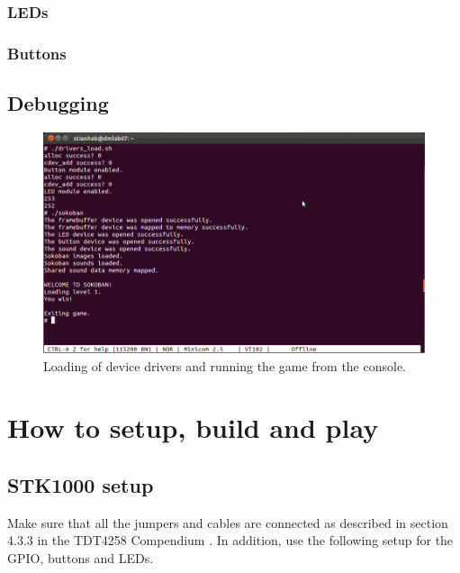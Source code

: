 \documentclass[a4paper,11pt]{article}
\begin{document}
\subsubsection{LEDs}

\subsubsection{Buttons}

\subsection{Debugging}
\begin{figure}[H]
\centering
\includegraphics[scale=0.4]{images/consolestart.png}
\caption{Loading of device drivers and running the game from the console.}
\label{fig:consolestart}
\end{figure}



\section{How to setup, build and play}
\subsection{STK1000 setup}
Make sure that all the jumpers and cables are connected as described in section 4.3.3 in the TDT4258 Compendium \cite{komp}.
In addition, use the following setup for the GPIO, buttons and LEDs.
\end{document}
